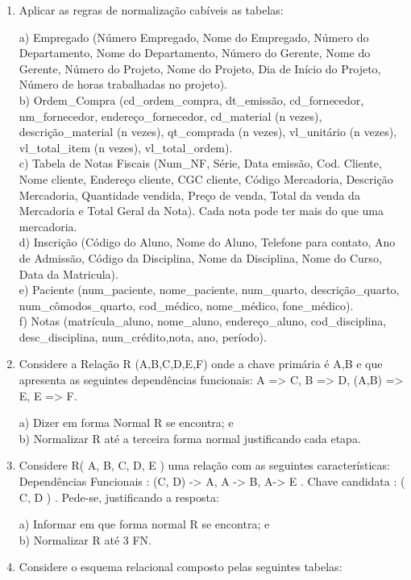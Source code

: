 \documentclass[11pt]{article}
\begin{document}
\begin{enumerate}
	\item Aplicar as regras de normalização cabíveis as tabelas:
	
	a) Empregado (Número Empregado, Nome do Empregado, Número do Departamento, Nome
	do Departamento, Número do Gerente, Nome do Gerente, Número do Projeto, Nome do
	Projeto, Dia de Início do Projeto, Número de horas trabalhadas no projeto).\\
	b) Ordem\_Compra (cd\_ordem\_compra, dt\_emissão, cd\_fornecedor, nm\_fornecedor,
	endereço\_fornecedor, cd\_material (n vezes), descrição\_material (n vezes), qt\_comprada (n
	vezes), vl\_unitário (n vezes), vl\_total\_item (n vezes), vl\_total\_ordem).\\
	c) Tabela de Notas Fiscais (Num\_NF, Série, Data emissão, Cod. Cliente, Nome cliente,
	Endereço cliente, CGC cliente, Código Mercadoria, Descrição Mercadoria, Quantidade
	vendida, Preço de venda, Total da venda da Mercadoria e Total Geral da Nota). Cada nota pode
	ter mais do que uma mercadoria.\\
	d) Inscrição (Código do Aluno, Nome do Aluno, Telefone para contato, Ano de Admissão,
	Código da Disciplina, Nome da Disciplina, Nome do Curso, Data da Matricula).\\
	e) Paciente (num\_paciente, nome\_paciente, num\_quarto, descrição\_quarto,
	num\_cômodos\_quarto, cod\_médico, nome\_médico, fone\_médico).\\
	f) Notas (matrícula\_aluno, nome\_aluno, endereço\_aluno, cod\_disciplina, desc\_disciplina,
	num\_crédito,nota, ano, período).
	
	\item Considere a Relação R (A,B,C,D,E,F) onde a chave primária é A,B e que apresenta as seguintes
	dependências funcionais: A => C, B => D, (A,B) => E, E => F.
	
	a) Dizer em forma Normal R se encontra; e\\
	b) Normalizar R até a terceira forma normal justificando cada etapa. 
	
	\item Considere R( A, B, C, D, E ) uma relação com as seguintes características: Dependências
	Funcionais : (C, D) -> A, A -> B, A-> E . Chave candidata : ( C, D ) . Pede-se, justificando a
	resposta:
	
	a) Informar em que forma normal R se encontra; e\\
	b) Normalizar R até 3 FN.
	
	\item Considere o esquema relacional composto pelas seguintes tabelas:
	

\end{enumerate}
\end{document}
